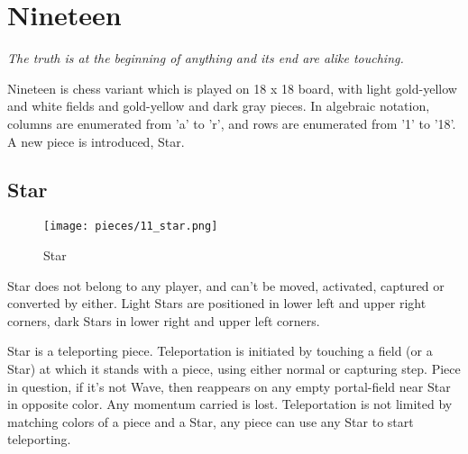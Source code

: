 

\chapter*{Nineteen}

\begin{flushright}
\parbox{0.8\textwidth}{
\emph{The truth is at the beginning of anything and its end are alike touching. \\
 } }
\end{flushright}

\noindent
Nineteen is chess variant which is played on 18 x 18 board, with
light gold-yellow and white fields and gold-yellow and dark gray
pieces. In algebraic notation, columns are enumerated from 'a' to 'r',
and rows are enumerated from '1' to '18'. A new piece is introduced,
Star.

\clearpage %

\section*{Star}

\noindent
\begin{wrapfigure}[11]{l}{0.4\textwidth}
\centering
\texttt{[image: pieces/11\_star.png]}
\caption{Star}
\label{fig:11_star}
\end{wrapfigure}
Star does not belong to any player, and can't be moved, activated, captured or converted by
either. Light Stars are positioned in lower left and upper right corners, dark Stars in lower
right and upper left corners.

Star is a teleporting piece. Teleportation is initiated by touching a field (or a Star) at
which it stands with a piece, using either normal or capturing step. Piece in question, if it's
not Wave, then reappears on any empty portal-field near Star in opposite color. Any momentum
carried is lost. Teleportation is not limited by matching colors of a piece and a Star, any
piece can use any Star to start teleporting.

